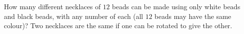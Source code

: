 How many different necklaces of $12$ beads can be made using only white beads and black beads, with any number of each (all $12$ beads may have the same colour)? Two necklaces are the same if one can be rotated to give the other.
